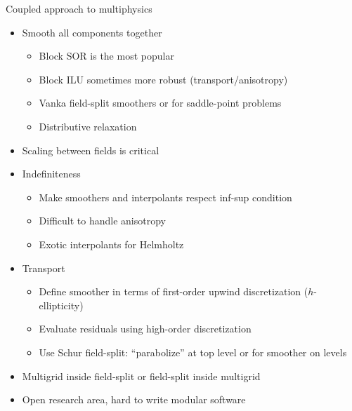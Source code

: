 \begin{frame}{Coupled approach to multiphysics}
  \begin{itemize}
  \item Smooth all components together
    \begin{itemize}
    \item Block SOR is the most popular
    \item Block ILU sometimes more robust (\eg transport/anisotropy)
    \item Vanka field-split smoothers or for saddle-point problems
    \item Distributive relaxation
    \end{itemize}
  \item Scaling between fields is critical
  \item Indefiniteness
    \begin{itemize}
    \item Make smoothers and interpolants respect inf-sup condition
    \item Difficult to handle anisotropy
    \item Exotic interpolants for Helmholtz
    \end{itemize}
  \item Transport
    \begin{itemize}
    \item Define smoother in terms of first-order upwind discretization ($h$-ellipticity)
    \item Evaluate residuals using high-order discretization
    \item Use Schur field-split: ``parabolize'' at top level or for smoother on levels
    \end{itemize}
  \item Multigrid inside field-split or field-split inside multigrid
  \item Open research area, hard to write modular software
  \end{itemize}
\end{frame}
